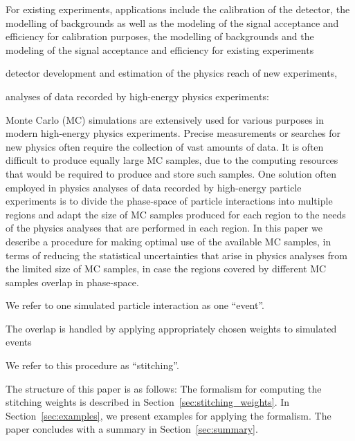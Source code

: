 For existing experiments, applications include the calibration of the detector, the modelling of backgrounds as well as the modeling of the signal acceptance and efficiency
for calibration purposes, the modelling of backgrounds and the modeling of the signal acceptance and efficiency for existing experiments

detector development and estimation of the physics reach of new experiments, 

analyses of data recorded by high-energy physics experiments:



Monte Carlo (MC) simulations are extensively used for various purposes in modern high-energy physics experiments.
Precise measurements or searches for new physics often require the collection of vast amounts of data.
It is often difficult to produce equally large MC samples, due to the computing resources that would be required to produce and store such samples.
One solution often employed in physics analyses of data recorded by high-energy particle experiments 
is to divide the phase-space of particle interactions into multiple regions 
and adapt the size of MC samples produced for each region to the needs of the physics analyses that are performed in each region.
In this paper we describe a procedure for making optimal use of the available MC samples, 
in terms of reducing the statistical uncertainties that arise in physics analyses from the limited size of MC samples,
in case the regions covered by different MC samples overlap in phase-space.


We refer to one simulated particle interaction as one ``event''.

The overlap is handled by applying appropriately chosen weights to simulated events

We refer to this procedure as ``stitching''.


The structure of this paper is as follows:
The formalism for computing the stitching weights is described in Section~\ref{sec:stitching_weights}.
In Section~\ref{sec:examples}, we present examples for applying the formalism.
The paper concludes with a summary in Section~\ref{sec:summary}.
